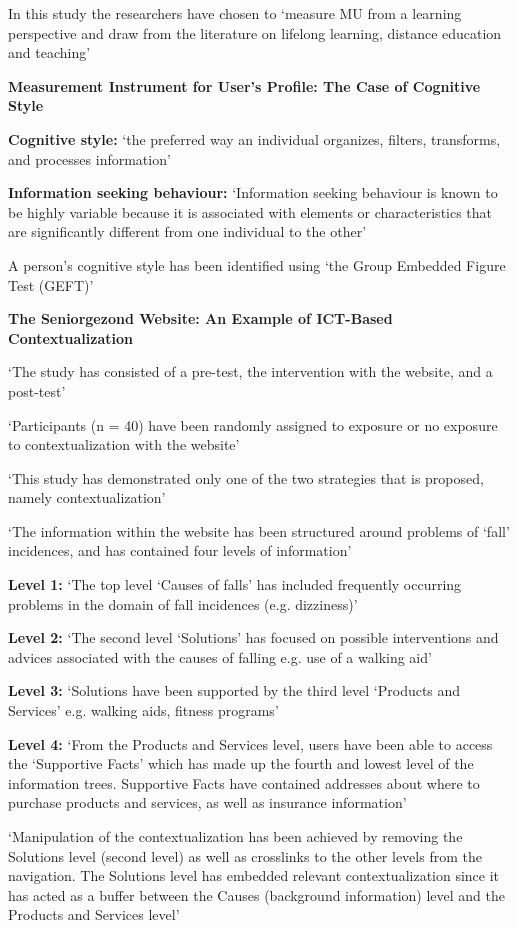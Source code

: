 \documentclass[]{article}
\begin{document}
In this study the researchers have chosen to ‘measure MU from a learning perspective and draw from the literature on lifelong learning, distance education and teaching’

\textbf{Measurement Instrument for User’s Profile: The Case of Cognitive Style}

\textbf{Cognitive style:} ‘the preferred way an individual organizes, filters, transforms, and processes information’

\textbf{Information seeking behaviour:} ‘Information seeking behaviour is known to be highly variable because it is associated with elements or characteristics that are significantly different from one individual to the other’

A person’s cognitive style has been identified using ‘the Group Embedded Figure Test (GEFT)’


\textbf{The Seniorgezond Website: An Example of ICT-Based Contextualization}

‘The study has consisted of a pre-test, the intervention with the website, and a post-test’

‘Participants (n = 40) have been randomly assigned to exposure or no exposure to contextualization with the website’

‘This study has demonstrated only one of the two strategies that is proposed, namely contextualization’

‘The information within the website has been structured around problems of ‘fall’ incidences, and has contained four levels of information’

\textbf{Level 1:} ‘The top level ‘Causes of falls’ has included frequently occurring problems in the domain of fall incidences (e.g. dizziness)’

\textbf{Level 2:} ‘The second level ‘Solutions’ has focused on possible interventions and advices associated with the causes of falling e.g. use of a walking aid’

\textbf{Level 3:} ‘Solutions have been supported by the third level ‘Products and Services’ e.g. walking aids, fitness programs’

\textbf{Level 4:} ‘From the Products and Services level, users have been able to access the ‘Supportive Facts’ which has made up the fourth and lowest level of the information trees. Supportive Facts have contained addresses about where to purchase products and services, as well as insurance information’

‘Manipulation of the contextualization has been achieved by removing the Solutions level (second level) as well as crosslinks to the other levels from the navigation. The Solutions level has embedded relevant contextualization since it has acted as a buffer between the Causes (background information) level and the Products and Services level’
\end{document}
